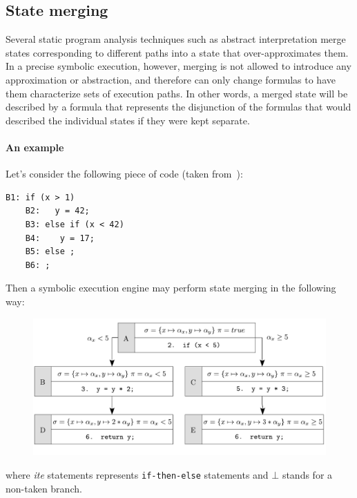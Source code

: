 \subsection{State merging}

Several static program analysis techniques such as abstract interpretation merge states corresponding to different paths into a state that over-approximates them. In a precise symbolic execution, however, merging is not allowed to introduce any approximation or abstraction, and therefore can only change formulas to have them characterize sets of execution paths. In other words, a merged state will be described by a formula that represents the disjunction of the formulas that would described the individual states if they were kept separate.

\paragraph{An example} Let's consider the following piece of code (taken from~\cite{VERITESTING-ICSE14}):
    \begin{lstlisting}[basicstyle=\ttfamily\small]
    B1: if (x > 1) 
    B2:   y = 42;
    B3: else if (x < 42) 
    B4:    y = 17;
    B5: else ;
    B6: ;
    \end{lstlisting}
Then a symbolic execution engine may perform state merging in the following way:
\begin{figure}[H]
  \centering
  \vspace{-3mm}
  \includegraphics[width=0.65\columnwidth]{images/state-merging} 
  \vspace{-3mm}
\end{figure}
where {\em ite} statements represents {\tt if-then-else} statements and $\bot$ stands for a non-taken branch.

